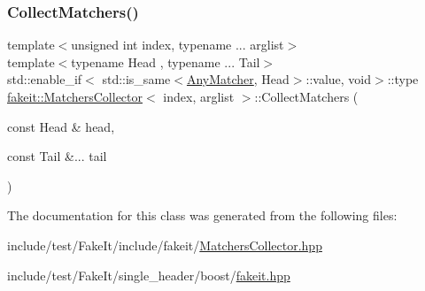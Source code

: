 \mbox{\label{classfakeit_1_1MatchersCollector_a5bc97a3d729b1bb67e372181ad88b77d}} 
\subsubsection{\texorpdfstring{CollectMatchers()}{CollectMatchers()}\hspace{0.1cm}{\footnotesize\ttfamily [63/63]}}
{\footnotesize\ttfamily template$<$unsigned int index, typename ... arglist$>$ \\
template$<$typename Head , typename ... Tail$>$ \\
std\+::enable\+\_\+if$<$ std\+::is\+\_\+same$<$\mbox{\hyperlink{structfakeit_1_1AnyMatcher}{Any\+Matcher}}, Head$>$\+::value, void$>$\+::type \mbox{\hyperlink{classfakeit_1_1MatchersCollector}{fakeit\+::\+Matchers\+Collector}}$<$ index, arglist $>$\+::Collect\+Matchers (\begin{DoxyParamCaption}\item[{const Head \&}]{head,  }\item[{const Tail \&...}]{tail }\end{DoxyParamCaption})\hspace{0.3cm}{\ttfamily [inline]}}



The documentation for this class was generated from the following files\+:\begin{DoxyCompactItemize}
\item 
include/test/\+Fake\+It/include/fakeit/\mbox{\hyperlink{MatchersCollector_8hpp}{Matchers\+Collector.\+hpp}}\item 
include/test/\+Fake\+It/single\+\_\+header/boost/\mbox{\hyperlink{single__header_2boost_2fakeit_8hpp}{fakeit.\+hpp}}\end{DoxyCompactItemize}
